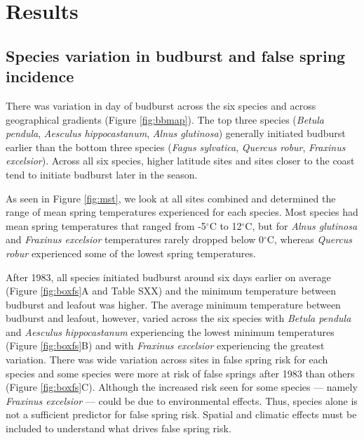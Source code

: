 \documentclass{article}\usepackage[]{graphicx}\usepackage[]{color}
\begin{document}

\section*{Results}
\subsection*{Species variation in budburst and false spring incidence}
There was variation in day of budburst across the six species and across geographical gradients (Figure \ref{fig:bbmap}). The top three species (\textit{Betula pendula}, \textit{Aesculus hippocastanum}, \textit{Alnus glutinosa}) generally initiated budburst earlier than the bottom three species (\textit{Fagus sylvatica}, \textit{Quercus robur}, \textit{Fraxinus excelsior}). Across all six species, higher latitude sites and sites closer to the coast tend to initiate budburst later in the season. 

As seen in Figure \ref{fig:mst}, we look at all sites combined and determined the range of mean spring temperatures experienced for each species. Most species had mean spring temperatures that ranged from -5$^{\circ}$C to 12$^{\circ}$C, but for \textit{Alnus glutinosa} and \textit{Fraxinus excelsior} temperatures rarely dropped below 0$^{\circ}$C, whereas \textit{Quercus robur} experienced some of the lowest spring temperatures. 

After 1983, all species initiated budburst around six days earlier on average (Figure \ref{fig:boxfs}A and Table SXX) and the minimum temperature between budburst and leafout was higher.  The average minimum temperature between budburst and leafout, however, varied across the six species with \textit{Betula pendula} and \textit{Aesculus hippocastanum} experiencing the lowest minimum temperatures (Figure \ref{fig:boxfs}B) and with \textit{Fraxinus excelsior} experiencing the greatest variation. There was wide variation across sites in false spring risk for each species and some species were more at risk of false springs after 1983 than others (Figure \ref{fig:boxfs}C). Although the increased risk seen for some species --- namely \textit{Fraxinus excelsior} --- could be due to environmental effects. Thus, species alone is not a sufficient predictor for false spring risk. Spatial and climatic effects must be included to understand what drives false spring risk. 
\end{document}
